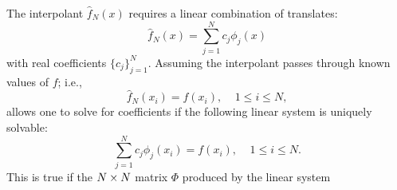 \documentclass{report}
\begin{document}
{   The interpolant $\hat{f}_N(x)$ requires a linear combination of translates:  
        \begin{equation*}
        \hat{f}_N(x) = \sum_{j=1}^{N} c_j \phi_j(x)
        \end{equation*}
    with real coefficients $\{c_j\}_{j=1}^{N}$. Assuming the interpolant passes through
    known values of $f$; i.e., 
        \begin{equation*} 
        \hat{f}_N(x_i) = f(x_i),\ \ \ \ \ 1 \leq i \leq N, 
        \end{equation*}
    allows one to solve for coefficients if the following linear system is uniquely
    solvable: 
        \begin{equation*} 
        \sum_{j=1}^{N} c_j \phi_j(x_i) = f(x_i),\ \ \ \ \ 1
        \leq i \leq N. 
        \end{equation*} 
    This is true if the $N \times N$ matrix $\Phi$ produced by the linear system
        \begin{align*} 

\end{align*}}
\end{document}
